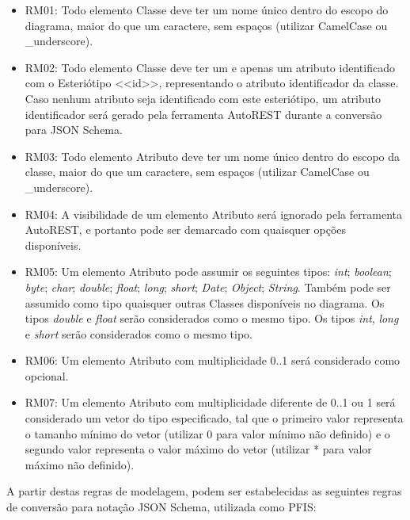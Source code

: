 \begin{itemize}
    \item RM01: Todo elemento Classe deve ter um nome único dentro do escopo do diagrama, maior do que um caractere, sem espaços (utilizar CamelCase ou \_underscore).

    \item RM02: Todo elemento Classe deve ter um e apenas um atributo identificado com o Esteriótipo <<id>>, representando o atributo identificador da classe. Caso nenhum atributo seja identificado com este esteriótipo, um atributo identificador será gerado pela ferramenta AutoREST durante a conversão para JSON Schema.

    \item RM03: Todo elemento Atributo deve ter um nome único dentro do escopo da classe, maior do que um caractere, sem espaços (utilizar CamelCase ou \_underscore).

    \item RM04: A visibilidade de um elemento Atributo será ignorado pela ferramenta AutoREST, e portanto pode ser demarcado com quaisquer opções disponíveis.

    \item RM05: Um elemento Atributo pode assumir os seguintes tipos: \textit{int}; \textit{boolean}; \textit{byte}; \textit{char}; \textit{double}; \textit{float}; \textit{long}; \textit{short}; \textit{Date}; \textit{Object}; \textit{String}. Também pode ser assumido como tipo quaisquer outras Classes disponíveis no diagrama. Os tipos \textit{double} e \textit{float} serão considerados como o mesmo tipo. Os tipos \textit{int}, \textit{long} e \textit{short} serão considerados como o mesmo tipo.

    \item RM06: Um elemento Atributo com multiplicidade 0..1 será considerado como opcional.

    \item RM07: Um elemento Atributo com multiplicidade diferente de 0..1 ou 1 será considerado um vetor do tipo especificado, tal que o primeiro valor representa o tamanho mínimo do vetor (utilizar 0 para valor mínimo não definido) e o segundo valor representa o valor máximo do vetor (utilizar * para valor máximo não definido).
\end{itemize}

A partir destas regras de modelagem, podem ser estabelecidas as seguintes regras de conversão para notação JSON Schema, utilizada como PFIS:

